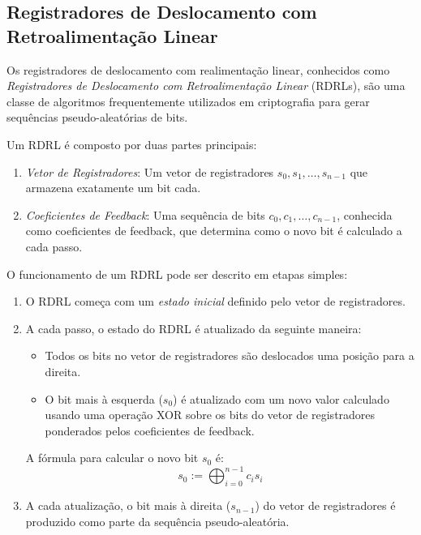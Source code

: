 \subsection{Registradores de Deslocamento com Retroalimentação Linear}
\label{sec:lfsr}

Os registradores de deslocamento com realimentação linear, conhecidos como {\em Registradores de Deslocamento com Retroalimentação Linear} (RDRLs), são uma classe de algoritmos frequentemente utilizados em criptografia para gerar sequências pseudo-aleatórias de bits.

Um RDRL é composto por duas partes principais:
\begin{enumerate}
    \item[] {\em Vetor de Registradores}: Um vetor de registradores \(s_0, s_1, \dots, s_{n-1}\) que armazena exatamente um bit cada.
    \item[] {\em Coeficientes de Feedback}: Uma sequência de bits \(c_0, c_1, \dots, c_{n-1}\), conhecida como coeficientes de feedback, que determina como o novo bit é calculado a cada passo.
\end{enumerate}

O funcionamento de um RDRL pode ser descrito em etapas simples:

\begin{enumerate}
    \item O RDRL começa com um {\em estado inicial} definido pelo vetor de registradores.
    \item A cada passo, o estado do RDRL é atualizado da seguinte maneira:
    \begin{itemize}
        \item Todos os bits no vetor de registradores são deslocados uma posição para a direita.
        \item O bit mais à esquerda ($s_0$) é atualizado com um novo valor calculado usando uma operação XOR sobre os bits do vetor de registradores ponderados pelos coeficientes de feedback.
    \end{itemize}
    A fórmula para calcular o novo bit $s_0$ é:
    \begin{displaymath}
    s_0 := \bigoplus_{i=0}^{n-1} c_i s_i
    \end{displaymath}

    \item A cada atualização, o bit mais à direita ($s_{n-1}$) do vetor de registradores é produzido como parte da sequência pseudo-aleatória.
\end{enumerate}

